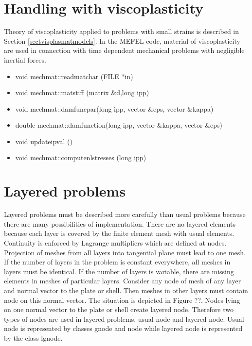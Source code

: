 \section{Handling with viscoplasticity}

Theory of viscoplasticity applied to problems with small strains is described in Section \ref{sectvisplasmatmodels}.
In the MEFEL code, material of viscoplasticity are used in connection with time dependent mechanical problems with
negligible inertial forces.


\begin{itemize}
\item {\sf void mechmat::readmatchar (FILE *in)}
\item {\sf void mechmat::matstiff (matrix \&d,long ipp)}
\item {\sf void mechmat::damfuncpar(long ipp, vector \&eps, vector \&kappa)}
\item {\sf double mechmat::damfunction(long ipp, vector \&kappa, vector \&eps)}
\item {\sf void updateipval ()}
\item {\sf void mechmat::computenlstresses (long ipp)}
\end{itemize}



\section{Layered problems}

Layered problems must be described more carefully than usual problems because there are many possibilities
of implementation. There are no layered elements because each layer is covered by the finite element mesh
with usual elements. Continuity is enforced by Lagrange multipliers which are defined at nodes. Projection
of meshes from all layers into tangential plane must lead to one mesh. If the number of layers in the problem
is constant everywhere, all meshes in layers must be identical. If the number of layers is variable, there are
missing elements in meshes of particular layers. Consider any node of mesh of any layer and normal vector to
the plate or shell. Then meshes in other layers must contain node on this normal vector. The situation is
depicted in Figure ??. Nodes lying on one normal vector to the plate or shell create layered node. Therefore
two types of nodes are used in layered problems, usual node and layered node. Usual node is represented
by classes {\sf gnode} and {\sf node} while layered node is represented by the class {\sf lgnode}.

